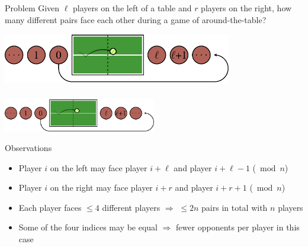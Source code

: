 \begin{frame}
  \frametitle{\problemtitle}
  \begin{block}{Problem}
  	Given $\ell$ players on the left of a table and $r$ players on the right, how many different pairs face each other during a game of around-the-table?
  \end{block}
	  \centering
\includegraphics[width=0.75\textwidth]{slide.pdf}
\end{frame}

\begin{frame}
	\frametitle{\problemtitle}
	  \centering
	\includegraphics[width=0.5\textwidth]{slide.pdf}
	\begin{block}{Observations}
		\begin{itemize}
			\item Player $i$ on the left may face player $i + \ell$ and player $i + \ell - 1$ ($\bmod n$)
			\item Player $i$ on the right may face player $i + r$ and player $i + r + 1$ ($\bmod n$)
			\pause 
			\item Each player faces $\leq 4$ different players $\Longrightarrow$ $\leq 2n$ pairs in total with $n$ players
			\pause
			\item Some of the four indices may be equal $\Longrightarrow$ fewer opponents per player in this case
		\end{itemize}


\end{block}
\end{frame}
